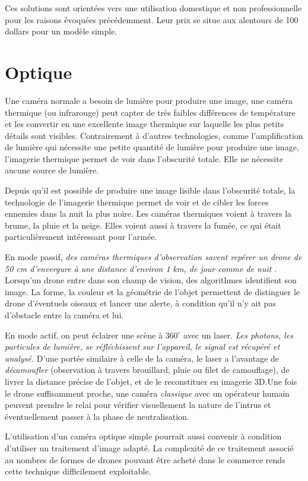  Ces solutions sont orientées vers une utilisation domestique et non professionnelle pour les raisons évoquées précédemment. Leur prix se situe aux alentours de 100 dollars pour un modèle simple.

\section{Optique}

Une caméra normale a besoin de lumière pour produire une image, une caméra thermique (ou infrarouge) peut capter de très faibles différences de température et les convertir en une excellente image thermique sur laquelle les plus petits détails sont visibles. Contrairement à d'autres technologies, comme l'amplification de lumière qui nécessite une petite quantité de lumière pour produire une image, l'imagerie thermique permet de voir dans l'obscurité totale. Elle ne nécessite aucune source de lumière.

Depuis qu'il est possible de produire une image lisible dans l'obscurité totale, la technologie de l'imagerie thermique permet de voir et de cibler les forces ennemies dans la nuit la plus noire. Les caméras thermiques voient à travers la brume, la pluie et la neige. Elles voient aussi à travers la fumée, ce qui était particulièrement intéressant pour l'armée.\cite{optique}

En mode passif, \emph{des caméras thermiques d'observation savent repérer un drone de 50 cm d'envergure à une distance d'environ 1 km, de jour comme de nuit} . Lorsqu'un drone entre dans son champ de vision, des algorithmes identifient son image. La forme, la couleur et la géométrie de l'objet permettent de distinguer le drone d'éventuels oiseaux et lancer une alerte, à condition qu'il n'y ait pas d'obstacle entre la caméra et lui.

En mode actif, on peut éclairer une scène à $360^{\circ}$ avec un laser. \emph{Les photons, les particules de lumière, se réfléchissent sur l'appareil, le signal est récupéré et analysé.} D'une portée similaire à celle de la caméra, le laser a l'avantage de \emph{décamoufler} (observation à travers brouillard, pluie ou filet de camouflage), de livrer la distance précise de l'objet, et de le reconstituer en imagerie 3D.Une fois le drone suffisamment proche, une caméra \textit{classique} avec un opérateur humain peuvent prendre le relai pour vérifier visuellement la nature de l'intrus et éventuellement passer à la phase de neutralisation.

L'utilisation d'un caméra optique simple pourrait aussi convenir à condition d'utiliser un traitement d'image adapté. La complexité de ce traitement associé au nombres de formes de drones pouvant être acheté dans le commerce rends cette technique difficilement exploitable.


